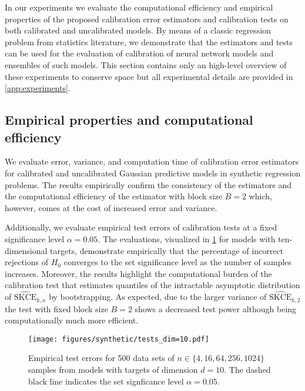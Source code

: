 \documentclass{article}
\begin{document}
In our experiments we evaluate the computational efficiency and empirical properties
of the proposed calibration error estimators and calibration tests on both calibrated
and uncalibrated models. By means of a classic regression problem from statistics
literature, we demonstrate that the estimators and tests can be used for the
evaluation of calibration of neural network models and ensembles of such models. This
section contains only an high-level overview of these experiments to conserve space but
all experimental details are provided in \cref{app:experiments}.

\subsection{Empirical properties and computational efficiency}

We evaluate error, variance, and computation time of calibration error
estimators for calibrated and uncalibrated Gaussian predictive models in synthetic
regression problems. The results empirically confirm the
consistency of the estimators and the computational efficiency of the estimator with
block size $B = 2$ which, however, comes at the cost of increased error and variance.

Additionally, we evaluate empirical test errors of calibration tests
at a fixed significance level $\alpha = 0.05$. The evaluations, visualized in
\cref{fig:synthetic_tests_10_main} for models with ten-dimensional targets, demonstrate
empirically that the percentage of incorrect rejections of $H_0$ converges to the set
significance level as the number of samples increases.
Moreover, the results highlight the computational burden of the calibration test
that estimates quantiles of the intractable asymptotic distribution of
$\widehat{\mathrm{SKCE}}_{k,n}$ by bootstrapping. As expected, due to the larger
variance of $\widehat{\mathrm{SKCE}}_{k,2}$ the test with fixed block size $B = 2$
shows a decreased test power although being computationally much more efficient.

\begin{figure}[!hbtp]
    \centering
    \texttt{[image: figures/synthetic/tests\_dim=10.pdf]}
    \caption{Empirical test errors for 500 data sets of $n \in \{4, 16, 64, 256, 1024\}$
    samples from models with targets of dimension $d = 10$. The dashed black line
    indicates the set signficance level $\alpha = 0.05$.}%
    \label{fig:synthetic_tests_10_main}
    \vspace{-\baselineskip}
\end{figure}
\end{document}
